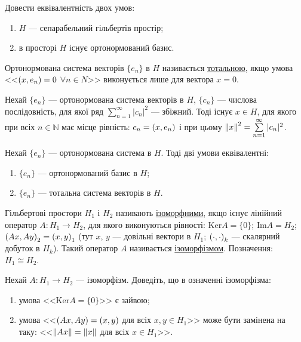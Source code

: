 \begin{exercise}
    Довести еквівалентність двох умов:
    \begin{enumerate}[label=\ukr*)]
        \item $H$ --- сепарабельний гільбертів простір;
        \item в просторі $H$ існує ортонормований базис.
    \end{enumerate}
\end{exercise}

\begin{theory}
    Ортонормована система векторів $\{e_n\}$ в $H$ називається \underline{тотальною}, 
    якщо умова <<$\left(x, e_n\right) = 0$ $\forall n \in N$>> виконується лише для вектора $x=0$.
\end{theory}

\begin{exercise}
    Нехай $\{e_n\}$ --- ортонормована система векторів в $H$, $\{c_n\}$ --- числова послідовність,
    для якої ряд $\sum\limits_{n=1}^\infty |c_n|^2$ --- збіжний. Тоді існує $x \in H$, 
    для якого при всіх $n \in \mathbb{N}$ має місце рівність: $c_n = \left(x, e_n\right)$ і при цьому 
    $\left\lVert x\right\rVert^2 = \sum\limits_{n=1}^\infty |c_n|^2$.
\end{exercise}

\begin{exercise}
    Нехай $\{e_n\}$ --- ортонормована система в $H$. Тоді дві умови еквівалентні:
    \begin{enumerate}[label=\ukr*)]
        \item $\{e_n\}$ --- ортонормований базис в $H$;
        \item $\{e_n\}$ --- тотальна система векторів в $H$.
    \end{enumerate}
\end{exercise}

\begin{theory}
    Гільбертові простори $H_1$ і $H_2$ називають \underline{ізоморфними}, якщо існує 
    лінійний оператор $A: H_1 \rightarrow H_2$, для якого виконуються рівності: 
    $\mathrm{Ker} A = \{0\}$; $\mathrm{Im} A = H_2$; $\left(Ax, Ay\right)_2 = \left(x, y\right)_1$ (тут $x$, $y$ --- довільні 
    вектори в $H_1$; $\left(\cdot, \cdot\right)_k$ --- скалярний добуток в $H_k$). 
    Такий оператор $A$ називається \underline{ізоморфізмом}. Позначення: $H_1 \cong H_2 $.
\end{theory}

\begin{exercise}
    Нехай $A: H_1 \rightarrow H_2$ --- ізоморфізм. Доведіть, що в означенні ізоморфізма:
    \begin{enumerate}[label=\ukr*)]
        \item умова <<$\mathrm{Ker} A = \{0\}$>> є зайвою;
        \item умова <<$\left(Ax, Ay\right) = \left(x, y\right)$ для всіх $x, y \in H_1$>> може бути 
        замінена на таку: <<$\left\lVert Ax\right\rVert = \left\lVert x\right\rVert$ для всіх $x \in H_1$>>.
    \end{enumerate}
\end{exercise}